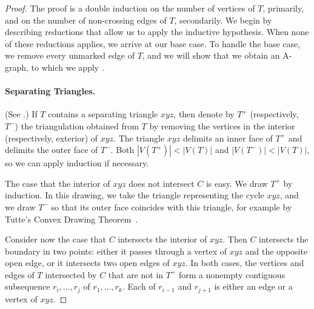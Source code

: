 \begin{proof}
  
	The proof is a double induction on the number of vertices of $T$, primarily, and on the number of non-crossing edges of $T$, secondarily.
	We begin by describing reductions that allow us to apply the
	inductive hypothesis. When none of these reductions applies,
	we arrive at our base case. To handle the base case,
	we remove every unmarked edge of $T$, and we will show that we obtain an A-graph, to which we
	apply .

	



        
\paragraph{Separating Triangles.}
(See .)
	If $T$ contains a separating triangle $xyz$, then denote by
        $T^+$ (respectively, $T^-$) the triangulation obtained from
        $T$ by removing the vertices in the interior
        (respectively, exterior) of $xyz$. The triangle $xyz$ delimits an
        inner face of $T^+$ and delimits the outer face of $T^-$.
Both $|V(T^+)|<|V(T)|$
and $|V(T^-)|<|V(T)|$, so we can apply induction if necessary.
        
The case that the interior of $xyz$ does not intersect $C$ is easy.
We draw $T^+$ by induction.  In this drawing, %
we take the triangle representing the cycle $xyz$, and we draw $T^-$
so that its outer face coincides with this triangle, for example by
Tutte's Convex Drawing Theorem~\cite{tutte:how}.

Consider now the case that $C$ intersects the interior of $xyz$. Then
$C$ intersects the boundary in two points: either it passes through a
vertex of $xyz$ and the opposite open edge, or it intersects two open
edges of $xyz$. %
In both cases, the vertices and edges of $T$ intersected by $C$ that
are not in $T^+$ form a nonempty contiguous subsequence
$r_i,\ldots,r_j$ of $r_1,\ldots,r_k$. Each of $r_{i-1}$ and $r_{j+1}$
is either an edge or a vertex of $xyz$.
	

\end{proof}

